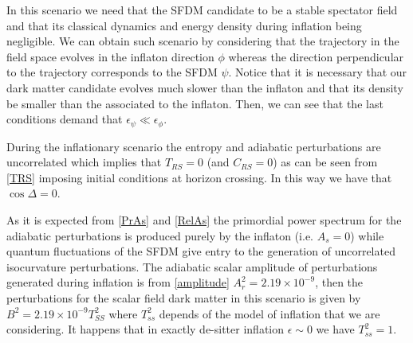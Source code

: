 \documentclass[amssymb,twocolumn,prd,nofootinbib,showpacs]{revtex4-1}
\begin{document}
In this scenario we need that the SFDM candidate to be a stable spectator field and that its classical dynamics and energy density during inflation being negligible. We can obtain such scenario by considering that the trajectory in the field space evolves in the inflaton direction $\phi$ whereas the direction perpendicular to the trajectory corresponds to the SFDM $\psi$. Notice that it is necessary that our dark matter candidate evolves much slower than the inflaton and that its density be smaller than the associated to the inflaton. Then, we can see that the last conditions demand that $\epsilon_\psi\ll \epsilon_\phi$.

During the inflationary scenario the entropy and adiabatic perturbations are uncorrelated which implies that $T_{RS}=0$ (and $C_{RS}=0$) as can be seen from \eqref{TRS} imposing initial conditions at horizon crossing. In this way we have that $\cos\Delta =0$. 

As it is expected from \eqref{PrAs} and \eqref{RelAs} the primordial power spectrum for the adiabatic perturbations is produced purely by the inflaton (i.e. $A_s=0$) while quantum fluctuations of the SFDM give entry to the generation of uncorrelated isocurvature perturbations. 
The adiabatic scalar amplitude of perturbations generated during inflation is from \eqref{amplitude} 
$A_r^2=2.19\times 10^{-9}$, then the perturbations for the scalar field dark matter in this scenario is given by $B^2=2.19\times 10^{-9}T_{SS}^2$ where $T_{ss}^2$ depends of the model of inflation that we are considering. It happens that in exactly de-sitter inflation $\epsilon\sim 0$ we have $T_{ss}^2=1$. 
\end{document}
